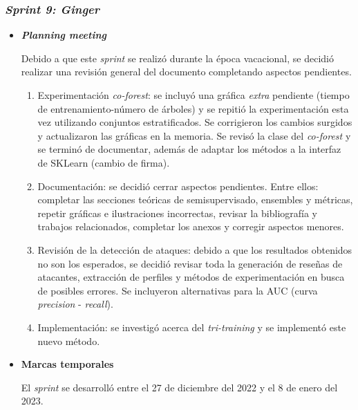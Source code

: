 \subsubsection{\textit{Sprint 9: Ginger}}
\begin{itemize}
	\item \textbf{\textit{Planning meeting}}
	
	Debido a que este \textit{sprint} se realizó durante la época vacacional, se decidió realizar una revisión general del documento completando aspectos pendientes.
	
	\begin{enumerate}
		\item Experimentación \textit{co-forest}: se incluyó una gráfica \textit{extra} pendiente (tiempo de entrenamiento-número de árboles) y se repitió la experimentación esta vez utilizando conjuntos estratificados. Se corrigieron los cambios surgidos y actualizaron las gráficas en la memoria. Se revisó la clase del \textit{co-forest} y se terminó de documentar, además de adaptar los métodos a la interfaz de SKLearn (cambio de firma).
		\item Documentación: se decidió cerrar aspectos pendientes. Entre ellos: completar las secciones teóricas de semisupervisado, ensembles y métricas, repetir gráficas e ilustraciones incorrectas, revisar la bibliografía y trabajos relacionados, completar los anexos y corregir aspectos menores.
		\item Revisión de la detección de ataques: debido a que los resultados obtenidos no son los esperados, se decidió revisar toda la generación de reseñas de atacantes, extracción de perfiles y métodos de experimentación en busca de posibles errores. Se incluyeron alternativas para la AUC (curva \textit{precision} - \textit{recall}).
		\item Implementación: se investigó acerca del \textit{tri-training} y se implementó este nuevo método.
	\end{enumerate}

	\item \textbf{Marcas temporales}		
	
	El \textit{sprint} se desarrolló entre el 27 de diciembre del 2022 y el 8 de enero del 2023.
	

\end{itemize}
